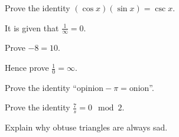 \documentclass{cie}
\begin{document}
  \subject{MATHEMATICS (FUNNIER)}
  \coverpage

  \begin{question}
    Prove the identity $(\cos x) (\sin x) = \csc x$. 
  \end{question}

  \begin{question}
    It is given that $\frac{1}{\infty} = 0$.

    \subquestion Prove $-8 = 10$. 

    \subquestion Hence prove $\frac{1}{0} = \infty$. 
  \end{question}

  \begin{question}
    \subquestion Prove the identity ``$\text{opinion} - \pi = \text{onion}$''.  

    \subquestion Prove the identity $\frac{7}{s} = 0 \mod 2$. 

    \subquestion Explain why obtuse triangles are always sad. 

    \printtotalmark
  \end{question}

  \finalstuff
\end{document}
